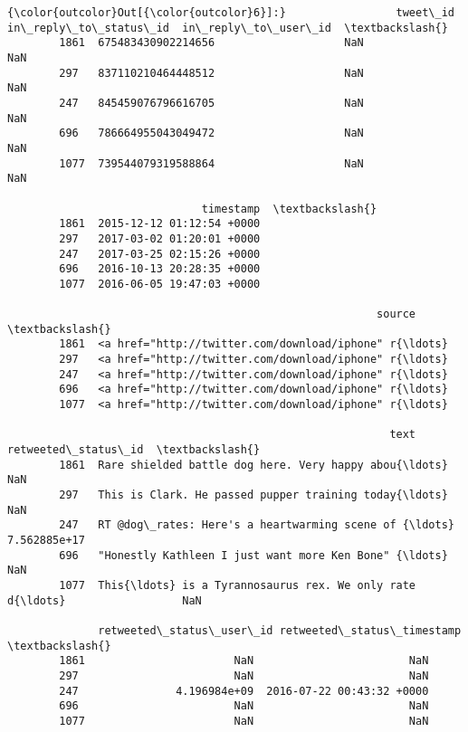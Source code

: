 \documentclass[11pt]{article}
\begin{document}
\begin{Verbatim}[commandchars=\\\{\}]
{\color{outcolor}Out[{\color{outcolor}6}]:}                 tweet\_id  in\_reply\_to\_status\_id  in\_reply\_to\_user\_id  \textbackslash{}
        1861  675483430902214656                    NaN                  NaN   
        297   837110210464448512                    NaN                  NaN   
        247   845459076796616705                    NaN                  NaN   
        696   786664955043049472                    NaN                  NaN   
        1077  739544079319588864                    NaN                  NaN   
        
                              timestamp  \textbackslash{}
        1861  2015-12-12 01:12:54 +0000   
        297   2017-03-02 01:20:01 +0000   
        247   2017-03-25 02:15:26 +0000   
        696   2016-10-13 20:28:35 +0000   
        1077  2016-06-05 19:47:03 +0000   
        
                                                         source  \textbackslash{}
        1861  <a href="http://twitter.com/download/iphone" r{\ldots}   
        297   <a href="http://twitter.com/download/iphone" r{\ldots}   
        247   <a href="http://twitter.com/download/iphone" r{\ldots}   
        696   <a href="http://twitter.com/download/iphone" r{\ldots}   
        1077  <a href="http://twitter.com/download/iphone" r{\ldots}   
        
                                                           text  retweeted\_status\_id  \textbackslash{}
        1861  Rare shielded battle dog here. Very happy abou{\ldots}                  NaN   
        297   This is Clark. He passed pupper training today{\ldots}                  NaN   
        247   RT @dog\_rates: Here's a heartwarming scene of {\ldots}         7.562885e+17   
        696   "Honestly Kathleen I just want more Ken Bone" {\ldots}                  NaN   
        1077  This{\ldots} is a Tyrannosaurus rex. We only rate d{\ldots}                  NaN   
        
              retweeted\_status\_user\_id retweeted\_status\_timestamp  \textbackslash{}
        1861                       NaN                        NaN   
        297                        NaN                        NaN   
        247               4.196984e+09  2016-07-22 00:43:32 +0000   
        696                        NaN                        NaN   
        1077                       NaN                        NaN   
        

\end{Verbatim}
\end{document}
